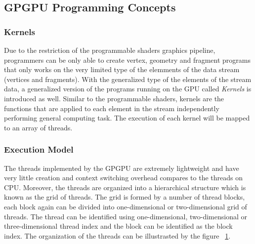 
\subsection{GPGPU Programming Concepts}

\subsubsection{Kernels}
Due to the restriction of the programmable shaders graphics pipeline, programmers can be only able to create vertex, geometry and fragment programs that only works on the very limited type of the elemments of the data stream (vertices and fragments). With the generalized type of the elements of the stream data, a generalized version of the programs running on the GPU called \emph{Kernels} is introduced as well. Similar to the programmable shaders, kernels are the functions that are applied to each element in the stream independently performing general computing task. The execution of each kernel will be mapped to an array of threads. 

\subsubsection{Execution Model}
The threads implemented by the GPGPU are extremely lightweight and have very little creation and context switching overhead compares to the threads on CPU. Moreover, the threads are organized into a hierarchical structure which is known as the grid of threads. The grid is formed by a number of thread blocks, each block again can be divided into one-dimensional or two-dimensional grid of threads. The thread can be identified using one-dimensional, two-dimensional or three-dimensional thread index and the block can be identified as the block index. The organization of the threads can be illustrasted by the figure ~\ref{fig:grid_of_thread_blocks}. 

\begin{figure}[htp] 
    \centering 
    \renewcommand{\thefigure}{\thechapter.\arabic{figure}}
    \caption[GPGPU Thread Hierarchy]{\emph{}}
    \label{fig:grid_of_thread_blocks} 
\end{figure}

